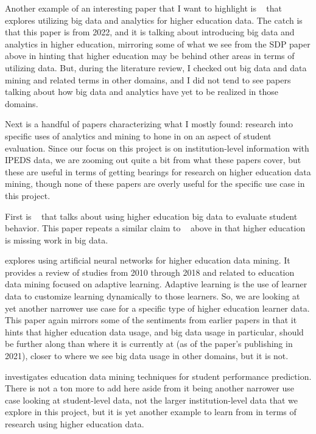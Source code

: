 \documentclass[sigconf, authorversion, nonacm]{acmart}
\begin{document}
    Another example of an interesting paper that I want to highlight is ~\cite{Hassna02102023} that explores utilizing big data and analytics for higher education data. The catch is that this paper is from 2022, and it is talking about introducing big data and analytics in higher education, mirroring some of what we see from the SDP paper above in hinting that higher education may be behind other areas in terms of utilizing data. But, during the literature review, I checked out big data and data mining and related terms in other domains, and I did not tend to see papers talking about how big data and analytics have yet to be realized in those domains.

    Next is a handful of papers characterizing what I mostly found: research into specific uses of analytics and mining to hone in on an aspect of student evaluation. Since our focus on this project is on institution-level information with IPEDS data, we are zooming out quite a bit from what these papers cover, but these are useful in terms of getting bearings for research on higher education data mining, though none of these papers are overly useful for the specific use case in this project.

    First is ~\cite{studentbehavioranalytics} that talks about using higher education big data to evaluate student behavior. This paper repeats a similar claim to ~\cite{Hassna02102023} above in that higher education is missing work in big data.

    \cite{Okewu10112021} explores using artificial neural networks for higher education data mining. It provides a review of studies from 2010 through 2018 and related to education data mining focused on adaptive learning. Adaptive learning is the use of learner data to customize learning dynamically to those learners. So, we are looking at yet another narrower use case for a specific type of higher education learner data. This paper again mirrors some of the sentiments from earlier papers in that it hints that higher education data usage, and big data usage in particular, should be further along than where it is currently at (as of the paper's publishing in 2021), closer to where we see big data usage in other domains, but it is not.

    \cite{10.3389/fpsyg.2021.698490} investigates education data mining techniques for student performance prediction. There is not a ton more to add here aside from it being another narrower use case looking at student-level data, not the larger institution-level data that we explore in this project, but it is yet another example to learn from in terms of research using higher education data.
\end{document}
